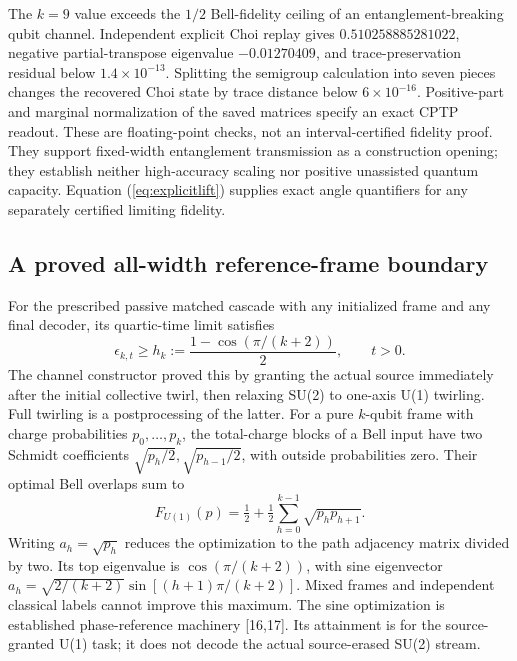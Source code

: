 The $k=9$ value exceeds the $1/2$ Bell-fidelity ceiling of an
entanglement-breaking qubit channel. Independent explicit Choi replay gives
$0.510258885281022$, negative partial-transpose eigenvalue $-0.01270409$,
and trace-preservation residual below $1.4\times10^{-13}$. Splitting the
semigroup calculation into seven pieces changes the recovered Choi state
by trace distance below $6\times10^{-16}$. Positive-part and marginal
normalization of the saved matrices specify an exact CPTP readout.
These are floating-point checks, not an interval-certified fidelity proof.
They support fixed-width entanglement transmission as a construction opening;
they establish neither high-accuracy scaling nor positive unassisted quantum
capacity. Equation (\ref{eq:explicitlift}) supplies exact angle quantifiers
for any separately certified limiting fidelity.

\subsection{A proved all-width reference-frame boundary}
For the prescribed passive matched cascade with any initialized frame and
any final decoder, its quartic-time limit satisfies
\[
 \epsilon_{k,t}\ge h_k:=\frac{1-\cos(\pi/(k+2))}{2},\qquad t>0.
\]
The channel constructor proved this by granting the actual source
immediately after the initial collective twirl, then relaxing SU(2) to
one-axis U(1) twirling. Full twirling is a postprocessing of the latter.
For a pure $k$-qubit frame with charge probabilities $p_0,\ldots,p_k$,
the total-charge blocks of a Bell input have two Schmidt coefficients
$\sqrt{p_h/2},\sqrt{p_{h-1}/2}$, with outside probabilities zero.
Their optimal Bell overlaps sum to
\[
 F_{U(1)}(p)=\tfrac12+\tfrac12\sum_{h=0}^{k-1}\sqrt{p_hp_{h+1}}.
\]
Writing $a_h=\sqrt{p_h}$ reduces the optimization to the path adjacency
matrix divided by two. Its top eigenvalue is $\cos(\pi/(k+2))$, with
sine eigenvector $a_h=\sqrt{2/(k+2)}\sin[(h+1)\pi/(k+2)]$.
Mixed frames and independent classical labels cannot improve this maximum.
The sine optimization is established phase-reference machinery [16,17].
Its attainment is for the source-granted U(1) task; it does not decode the
actual source-erased SU(2) stream.

